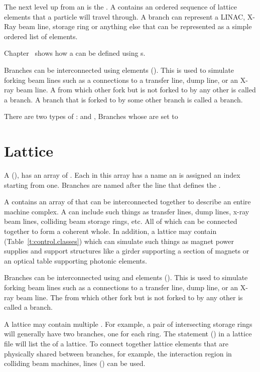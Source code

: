 The next level up from an  is the . A 
 contains an ordered sequence of lattice elements that a particle will travel through. A
branch can represent a LINAC, X-Ray beam line, storage ring or anything else that can be represented
as a simple ordered list of elements.

Chapter~ shows how a  can be defined using s.

Branches can be interconnected using  elements (). This
is used to simulate forking beam lines such as a connections to a transfer line, dump line, or an
X-ray beam line. A  from which other  fork but is not forked to by any
other  is called a  branch. A branch that is forked to by some other branch
is called a  branch.

There are two types of :  and , Branches whose  are set to 


\section{Lattice}
\label{s:lattice.def}

A  (), has an array of . 
Each  in this array
has a name an is assigned an index starting from one. 
Branches are named after the line that defines the .

A  contains an array of  that can be interconnected 
together to describe an entire machine
complex. A  can include such things as transfer lines, dump lines, x-ray beam lines,
colliding beam storage rings, etc. All of which can be connected together to form a coherent whole. 
In addition, a lattice may contain  (Table~\ref{t:control.classes}) 
which can
simulate such things as magnet power supplies and support structures like a girder supporting
a section of magnets or an optical table supporting photonic elements.

Branches can be interconnected using  and  elements (). This
is used to simulate forking beam lines such as a connections to a transfer line, dump line, or an
X-ray beam line. The  from which other  fork but is not forked to by any
other  is called a  branch.

A lattice may contain multiple  . For example, a pair of intersecting storage
rings will generally have two  branches, one for each ring. The  statement
() in a lattice file will list the   of a lattice. To connect
together lattice elements that are physically shared between branches, for example, the interaction
region in colliding beam machines,  lines () can be used.


